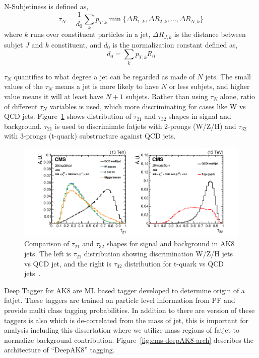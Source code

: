 N-Subjetiness is defined as,
\begin{equation}
  \tau_N = \frac{1}{d_0} \sum_k p_{T,k} \min \{ \Delta R_{1,k}, \Delta R_{2,k}, \ldots , \Delta R_{N,k} \}
\end{equation}
where \( k \) runs over constituent particles in a jet, \( \Delta R_{J,k} \)
is the distance between subjet \( J \) and \( k \) constituent, and \( d_0 \)
is the normalization constant defined as,
\begin{equation}
  d_0 = \sum_k p_{T,k} R_0
\end{equation}

\( \tau_N \) quantifies to what degree a jet can be regarded as made of \( N \) jets.
The small values of the \( \tau_N \) means a jet is more likely to have
\( N \) or less subjets, and higher value means it will at least have \( N + 1\)
subjets. Rather than using \( \tau_N \) alone, ratio of different \( \tau_N \)
variables is used, which more discriminating for cases like W vs QCD jets.
Figure~\ref{fig:cms-tau21-tau32-comparison} shows distribution of
\( \tau_{21} \) and \( \tau_{32} \) shapes in signal and background.
\( \tau_{21} \) is used to discriminate fatjets with 2-prongs (W/Z/H)
and \( \tau_{32} \) with 3-prongs (t-quark) substructure against QCD jets.

\begin{figure}[!ht]
  \centering
  \includegraphics[width=\textwidth]{figures/CMS_JME_18_002_Figure_003.pdf}
  \caption[Comparison of \( \tau_{21} \) and \( \tau_{32} \) shapes for signal and background in AK8 jets]%
  {Comparison of \( \tau_{21} \) and \( \tau_{32} \) shapes for signal and background in AK8 jets.
    The left is \( \tau_{21} \) distribution showing discrimination W/Z/H jets
    vs QCD jet, and the right is \( \tau_{32} \) distribution for t-quark vs
    QCD jets~\cite{cms-jme-deep-tagger}.}%
  \label{fig:cms-tau21-tau32-comparison}
\end{figure}

Deep Tagger for AK8 are \gls{ML} based tagger developed to determine
origin of a fatjet. These taggers are trained on particle level information
from \gls{PF} and provide multi class tagging probabilities. In addition to
there are version of these taggers is also which is de-correlated from the mass of jet,
this is important for analysis including this dissertation where we utilize
mass regions of fatjet to normalize background contribution. Figure~\ref{fig:cms-deepAK8-arch}
describes the architecture of ``DeepAK8'' tagging.

